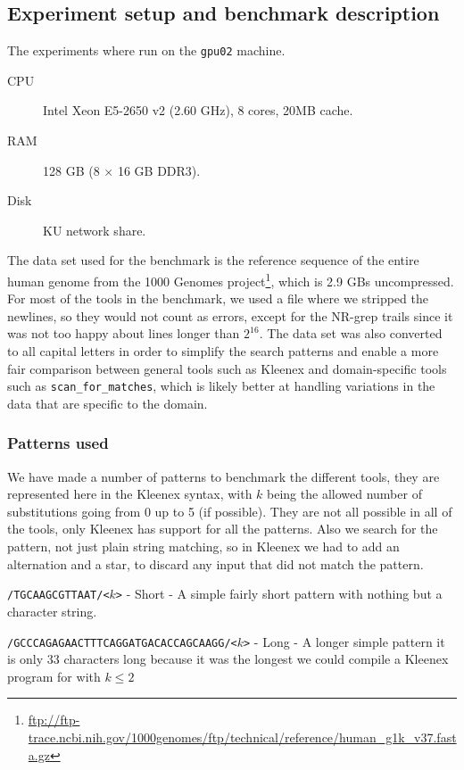 \subsection{Experiment setup and benchmark description}
The experiments where run on the \texttt{gpu02} machine.
\begin{description}
    \item[CPU] Intel Xeon E5-2650 v2 (2.60 GHz), 8 cores, 20MB cache.
    \item[RAM] 128 GB (8 $\times$ 16 GB DDR3).
    \item[Disk] KU network share.
\end{description}

The data set used for the benchmark is the reference sequence of the entire
human genome from the 1000 Genomes
project\footnote{\url{ftp://ftp-trace.ncbi.nih.gov/1000genomes/ftp/technical/reference/human_g1k_v37.fasta.gz}},
which is 2.9 GBs uncompressed. For most of the tools in the benchmark, we used
a file where we stripped the newlines, so they would not count as errors,
except for the NR-grep trails since it was not too happy about lines longer
than $2^{16}$. The data set was also converted to all capital letters in order
to simplify the search patterns and enable a more fair comparison between
general tools such as Kleenex and domain-specific tools such as
\texttt{scan\_for\_matches}, which is likely better at handling variations in
the data that are specific to the domain.

\subsubsection{Patterns used}
We have made a number of patterns to benchmark the different tools, they are
represented here in the Kleenex syntax, with $k$ being the allowed number of
substitutions going from 0 up to 5 (if possible). They are not all possible in
all of the tools, only Kleenex has support for all the patterns. Also we search
for the pattern, not just plain string matching, so in Kleenex we had to add an
alternation and a star, to discard any input that did not match the pattern.

\texttt{/TGCAAGCGTTAAT/<$k$>} - Short - A simple fairly short pattern with
nothing but a character string.

\texttt{/GCCCAGAGAACTTTCAGGATGACACCAGCAAGG/<$k$>} - Long - A longer simple
pattern it is only 33 characters long because it was the longest we could
compile a Kleenex program for with $k \leq 2$

